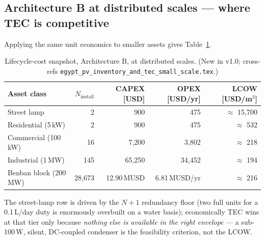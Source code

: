 \documentclass[11pt,a4paper]{article}
\begin{document}
\subsection{Architecture B at distributed scales --- where TEC is competitive}
Applying the same unit economics to smaller assets gives Table~\ref{tab:lcc_distributed}.

\begin{table}[h]
\centering\small
\caption{Lifecycle-cost snapshot, Architecture B, at distributed scales. (New in v1.0; cross-refs \texttt{egypt\_pv\_inventory\_and\_tec\_small\_scale.tex}.)}
\label{tab:lcc_distributed}
\begin{tabular}{@{}lrrrr@{}}
\toprule
\textbf{Asset class} & \textbf{$N_{\mathrm{install}}$} & \textbf{CAPEX [USD]} & \textbf{OPEX [USD/yr]} & \textbf{LCOW [USD/m$^3$]}\\
\midrule
Street lamp                  & 2           & 900                & 475      & $\approx$ 15{,}700 \\
Residential (5\,kW)          & 2           & 900                & 475      & $\approx$ 532 \\
Commercial (100\,kW)         & 16          & 7{,}200            & 3{,}802  & $\approx$ 218 \\
Industrial (1\,MW)           & 145         & 65{,}250           & 34{,}452 & $\approx$ 194 \\
Benban block (200\,MW)       & 28{,}673    & 12.90\,MUSD        & 6.81\,MUSD/yr & $\approx$ 216 \\
\bottomrule
\end{tabular}
\end{table}

\noindent
The street-lamp row is driven by the $N{+}1$ redundancy floor (two full units for a 0.1\,L/day duty is enormously overbuilt on a water basis); economically TEC wins at that tier only because \emph{nothing else is available in the right envelope} --- a sub-100\,W, silent, DC-coupled condenser is the feasibility criterion, not the LCOW.

\end{document}
